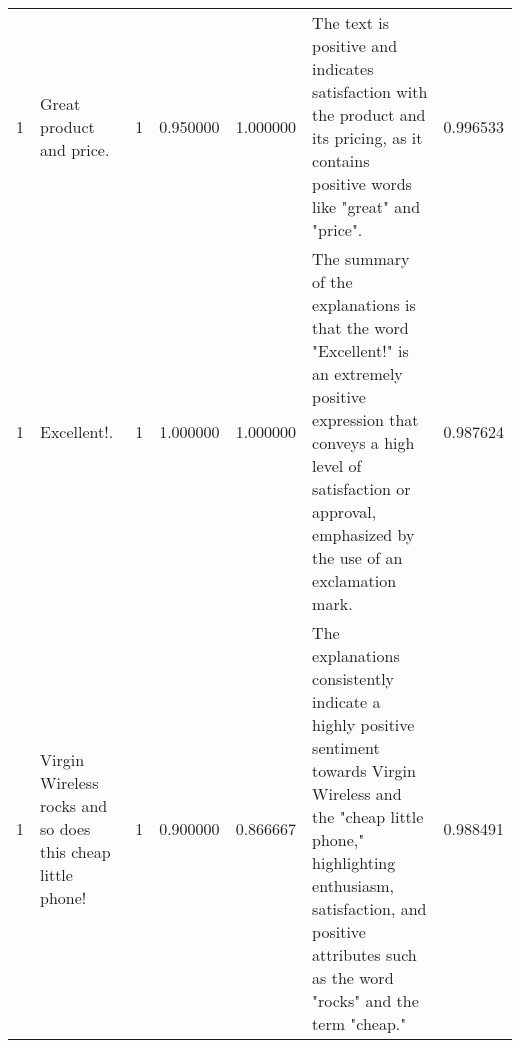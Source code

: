 \begin{tabular}{rlrrrlr}
1 & Great product and price. & 1 & 0.950000 & 1.000000 & The text is positive and indicates satisfaction with the product and its pricing, as it contains positive words like "great" and "price". & 0.996533 \\
1 & Excellent!. & 1 & 1.000000 & 1.000000 & The summary of the explanations is that the word "Excellent!" is an extremely positive expression that conveys a high level of satisfaction or approval, emphasized by the use of an exclamation mark. & 0.987624 \\
1 & Virgin Wireless rocks and so does this cheap little phone! & 1 & 0.900000 & 0.866667 & The explanations consistently indicate a highly positive sentiment towards Virgin Wireless and the "cheap little phone," highlighting enthusiasm, satisfaction, and positive attributes such as the word "rocks" and the term "cheap." & 0.988491 \\
\bottomrule
\end{tabular}
